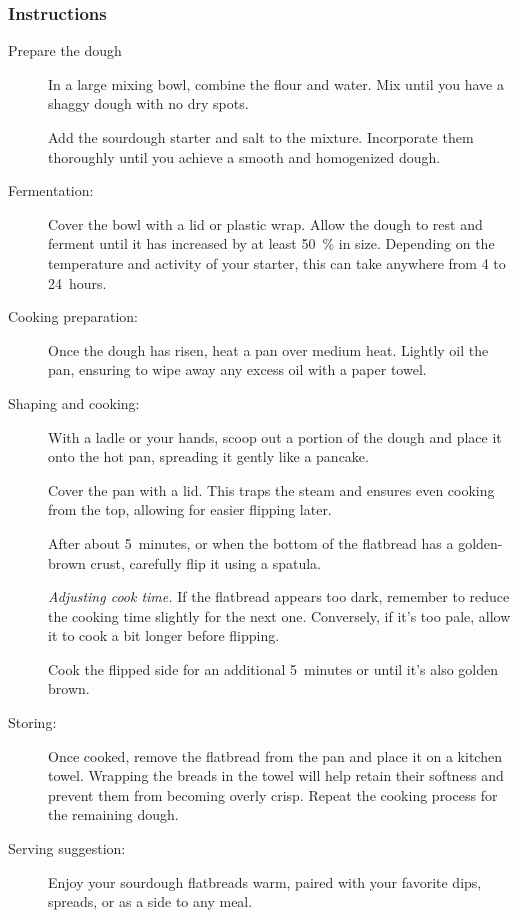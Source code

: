 \subsubsection*{Instructions}
\begin{description}
\item[Prepare the dough] In a large mixing bowl, combine the flour and water.
Mix until you have a shaggy dough with no dry spots.

Add the sourdough starter and salt to the mixture. Incorporate them thoroughly
until you achieve a smooth and homogenized dough.

\item[Fermentation:] Cover the bowl with a lid or plastic wrap. Allow the dough
    to rest and ferment until it has increased by at least \qty{50}{\percent}
    in size.  Depending on the temperature and activity of your starter, this
    can take anywhere from 4 to 24~hours.

\item[Cooking preparation:] Once the dough has risen, heat a pan over medium heat.
Lightly oil the pan, ensuring to wipe away any excess oil with a paper towel.

\item[Shaping and cooking:] With a ladle or your hands, scoop out a portion of
the dough and place it onto the hot pan, spreading it gently like a pancake.

Cover the pan with a lid. This traps the steam and ensures even cooking
from the top, allowing for easier flipping later.

After about 5~minutes, or when the bottom of the flatbread has a
golden-brown crust, carefully flip it using a spatula.

\emph{Adjusting cook time.} If the flatbread appears too dark,
remember to reduce the cooking time slightly for the next one.
Conversely, if it's too pale, allow it to cook a bit longer before flipping.

Cook the flipped side for an additional 5~minutes or until it's also golden
brown.

\item[Storing:] Once cooked, remove the flatbread from the pan and place it on a
kitchen towel. Wrapping the breads in the towel will help retain their
softness and prevent them from becoming overly crisp.
Repeat the cooking process for the remaining dough.

\item[Serving suggestion:] Enjoy your sourdough flatbreads warm,
paired with your favorite dips, spreads, or as a side to any meal.

\end{description}
